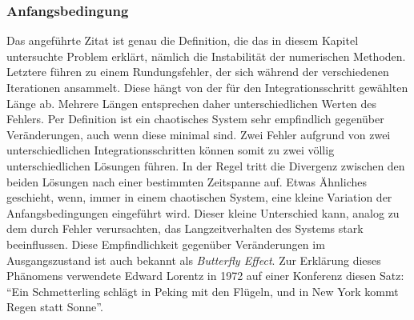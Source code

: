 \subsubsection{Anfangsbedingung}
\label{vanderpol:subsubsection:anfangsbedingung}
Das angeführte Zitat ist genau die Definition, die das in diesem Kapitel untersuchte Problem erklärt, nämlich die Instabilität der numerischen Methoden. Letztere führen zu einem Rundungsfehler, der sich während der verschiedenen Iterationen ansammelt. Diese hängt von der für den Integrationsschritt gewählten Länge ab. Mehrere Längen entsprechen daher unterschiedlichen Werten des Fehlers. Per Definition ist ein chaotisches System sehr empfindlich gegenüber Veränderungen, auch wenn diese minimal sind. Zwei Fehler aufgrund von zwei unterschiedlichen Integrationsschritten können somit zu zwei völlig unterschiedlichen Lösungen führen. In der Regel tritt die Divergenz zwischen den beiden Lösungen nach einer bestimmten Zeitspanne auf. Etwas Ähnliches geschieht, wenn, immer in einem chaotischen System, eine kleine Variation der Anfangsbedingungen eingeführt wird. Dieser kleine Unterschied kann, analog zu dem durch Fehler verursachten, das Langzeitverhalten des Systems stark beeinflussen. Diese Empfindlichkeit gegenüber Veränderungen im Ausgangszustand ist auch bekannt als {\em Butterfly Effect}. Zur Erklärung dieses Phänomens verwendete Edward Lorentz in 1972 auf einer Konferenz diesen Satz:\\``Ein Schmetterling schlägt in Peking mit den Flügeln, und in New York kommt Regen statt Sonne''.


